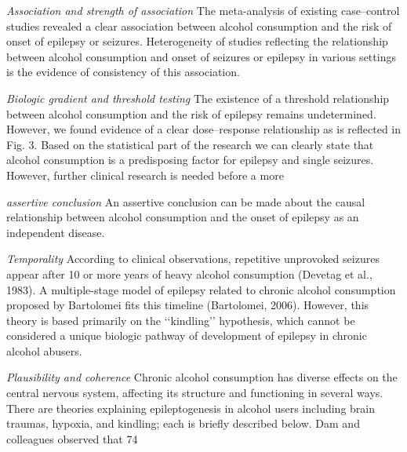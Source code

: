 \documentclass{article}
\begin{document}
\textit{Association and strength of association}
The meta-analysis of existing case–control studies
revealed a clear association between alcohol consumption
and the risk of onset of epilepsy or seizures. Heterogeneity
of studies reflecting the relationship between alcohol consumption and onset of seizures or epilepsy in various settings is the evidence of consistency of this association.

\textit{Biologic gradient and threshold testing}
The existence of a threshold relationship between alcohol
consumption and the risk of epilepsy remains undetermined.
However, we found evidence of a clear dose–response relationship as is reflected in Fig. 3. Based on the statistical part
of the research we can clearly state that alcohol consumption is a predisposing factor for epilepsy and single seizures.
However, further clinical research is needed before a more


\textit{assertive conclusion}
An assertive conclusion can be made about the causal relationship between alcohol consumption and the onset of epilepsy as an independent disease.

\textit{Temporality}
According to clinical observations, repetitive unprovoked seizures appear after 10 or more years of heavy alcohol consumption (Devetag et al., 1983). A multiple-stage model of epilepsy related to chronic alcohol consumption proposed by Bartolomei fits this timeline (Bartolomei, 2006). However, this theory is based primarily on the ‘‘kindling’’ hypothesis, which cannot be considered a unique biologic pathway of development of epilepsy in chronic alcohol abusers.

\textit{Plausibility and coherence}
Chronic alcohol consumption has diverse effects on the central nervous system, affecting its structure and functioning in several ways. There are theories explaining epileptogenesis in alcohol users including brain traumas, hypoxia, and kindling; each is briefly described below. Dam and colleagues observed that 74%
\end{document}
